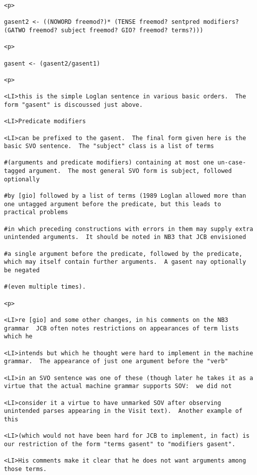 \documentclass[12pt]{article}
\begin{document}
\begin{lstlisting}
<p>

gasent2 <- ((NOWORD freemod?)* (TENSE freemod? sentpred modifiers? (GATWO freemod? subject freemod? GIO? freemod? terms?)))

<p>

gasent <- (gasent2/gasent1)

<p>

<LI>this is the simple Loglan sentence in various basic orders.  The form "gasent" is discoussed just above.

<LI>Predicate modifiers

<LI>can be prefixed to the gasent.  The final form given here is the basic SVO sentence.  The "subject" class is a list of terms

#(arguments and predicate modifiers) containing at most one un-case-tagged argument.  The most general SVO form is subject, followed optionally

#by [gio] followed by a list of terms (1989 Loglan allowed more than one untagged argument before the predicate, but this leads to practical problems

#in which preceding constructions with errors in them may supply extra unintended arguments.  It should be noted in NB3 that JCB envisioned

#a single argument before the predicate, followed by the predicate, which may itself contain further arguments.  A gasent nay optionally be negated

#(even multiple times).

<p>

<LI>re [gio] and some other changes, in his comments on the NB3 grammar  JCB often notes restrictions on appearances of term lists which he

<LI>intends but which he thought were hard to implement in the machine grammar.  The appearance of just one argument before the "verb"

<LI>in an SVO sentence was one of these (though later he takes it as a virtue that the actual machine grammar supports SOV:  we did not

<LI>consider it a virtue to have unmarked SOV after observing unintended parses appearing in the Visit text).  Another example of this

<LI>(which would not have been hard for JCB to implement, in fact) is our restriction of the form "terms gasent" to "modifiers gasent".

<LI>His comments make it clear that he does not want arguments among those terms.


\end{lstlisting}
\end{document}
